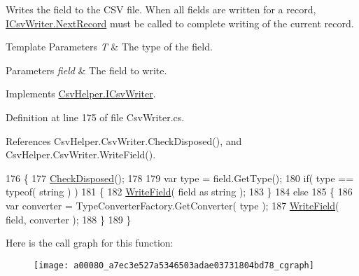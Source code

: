Writes the field to the C\-S\-V file. When all fields are written for a record, \hyperlink{a00114_a6bb1687959808ea1219fa68e7f3060fa}{I\-Csv\-Writer.\-Next\-Record} must be called to complete writing of the current record. 


\begin{DoxyTemplParams}{Template Parameters}
{\em T} & The type of the field.\\
\hline
\end{DoxyTemplParams}

\begin{DoxyParams}{Parameters}
{\em field} & The field to write.\\
\hline
\end{DoxyParams}


Implements \hyperlink{a00114_ae9b669ef98e0c3ac3b2eb2345b9f095e}{Csv\-Helper.\-I\-Csv\-Writer}.



Definition at line 175 of file Csv\-Writer.\-cs.



References Csv\-Helper.\-Csv\-Writer.\-Check\-Disposed(), and Csv\-Helper.\-Csv\-Writer.\-Write\-Field().


\begin{DoxyCode}
176         \{
177             \hyperlink{a00080_a15e26ec8c5c935030677bee9a36d7c16}{CheckDisposed}();
178 
179             var type = field.GetType();
180             \textcolor{keywordflow}{if}( type == typeof( \textcolor{keywordtype}{string} ) )
181             \{
182                 \hyperlink{a00080_a994d9b339c4cda8bf83d5665b5c4ff1a}{WriteField}( field as \textcolor{keywordtype}{string} );
183             \}
184             \textcolor{keywordflow}{else}
185             \{
186                 var converter = TypeConverterFactory.GetConverter( type );
187                 \hyperlink{a00080_a994d9b339c4cda8bf83d5665b5c4ff1a}{WriteField}( field, converter );
188             \}
189         \}
\end{DoxyCode}


Here is the call graph for this function\-:
\nopagebreak
\begin{figure}[H]
\begin{center}
\leavevmode
\texttt{[image: a00080\_a7ec3e527a5346503adae03731804bd78\_cgraph]}
\end{center}
\end{figure}


